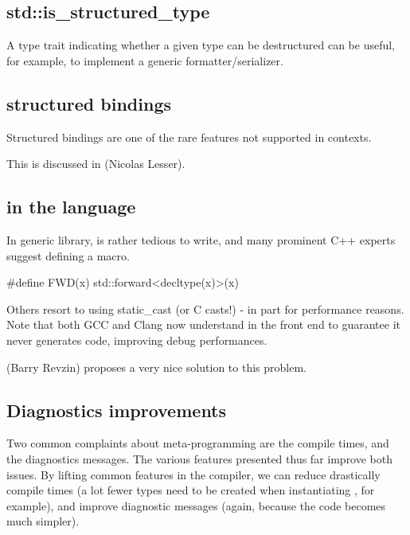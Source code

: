 \documentclass{wg21}
\begin{document}
\subsection{std::is_structured_type}

A type trait indicating whether a given type can be destructured can be useful, for example, to implement a generic
formatter/serializer.

\subsection{ structured bindings}

Structured bindings are one of the rare features not supported in  contexts.

This is discussed in (Nicolas Lesser).

\subsection{ in the language}

In generic library,  is rather tedious to write, and
many prominent C++ experts suggest defining a macro.

\begin{colorblock}
#define FWD(x) std::forward<decltype(x)>(x)
\end{colorblock}

Others resort to using static_cast (or C casts!) - in part for performance reasons.
Note that both GCC and Clang now understand  in the front end to guarantee it never generates code,
improving debug performances.

 (Barry Revzin) proposes a very nice solution to this problem.

\subsection{Diagnostics improvements}

Two common complaints about meta-programming are the compile times,
and the diagnostics messages.
The various features presented thus far improve both issues. By lifting common features in the compiler,
we can reduce drastically compile times (a lot fewer types need to be created when instantiating , for example), and improve diagnostic messages (again, because the code becomes much simpler).
\end{document}
